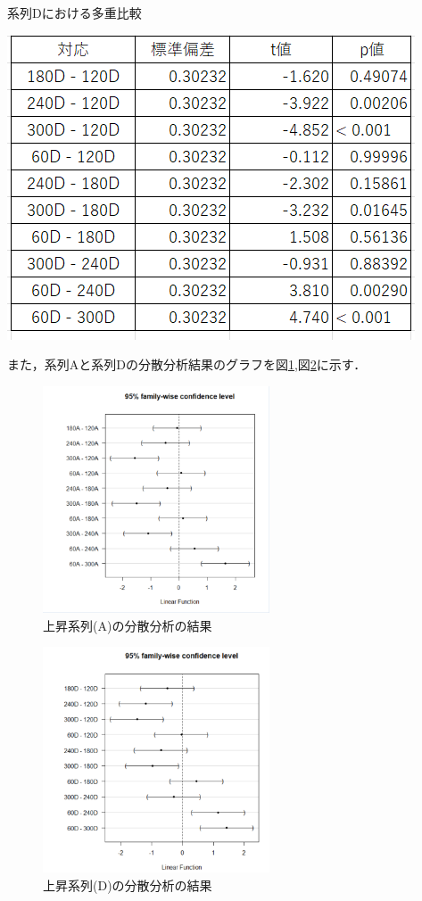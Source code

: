 \documentclass{jlreq}
\numberwithin{equation}{section}
\begin{document}
\begin{table}[H]
  \centering
  \caption{系列Dにおける多重比較}
  \includegraphics{image/d_result.png}
  \label{tab:d_result}
\end{table}

また，系列Aと系列Dの分散分析結果のグラフを図\ref{fig:result_a},図\ref{fig:result_d}に示す．
\begin{figure}[H]
  \centering
  \includegraphics[width=0.6\textwidth]{image/a_信頼区間.png}
  \caption{上昇系列(A)の分散分析の結果}
  \label{fig:result_a}
\end{figure}

\begin{figure}[H]
  \centering
  \includegraphics[width=0.6\textwidth]{image/d_信頼区間.png}
  \caption{上昇系列(D)の分散分析の結果}
  \label{fig:result_d}
\end{figure}
\end{document}
